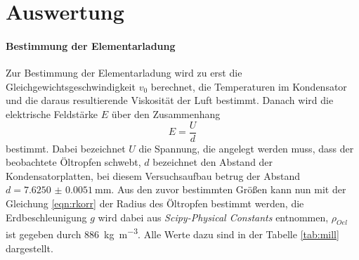 \section{Auswertung}
\label{sec:Auswertung}
\paragraph{Bestimmung der Elementarladung}
Zur Bestimmung der Elementarladung wird zu erst die Gleichgewichtsgeschwindigkeit
$v_0$ berechnet, die Temperaturen im Kondensator und die daraus resultierende
Viskosität der Luft bestimmt. Danach wird die elektrische Feldstärke $E$ über
den Zusammenhang
\begin{equation*}
  E = \frac{U}{d}
\end{equation*}
bestimmt. Dabei bezeichnet $U$ die Spannung, die angelegt werden muss, dass der
beobachtete Öltropfen schwebt, $d$ bezeichnet den Abstand der Kondensatorplatten,
bei diesem Versuchsaufbau betrug der Abstand $d = \SI{7.6250(51)}{\milli\meter}$.
Aus den zuvor bestimmten Größen kann nun mit der Gleichung \eqref{eqn:rkorr}
der Radius des Öltropfen bestimmt werden, die Erdbeschleunigung
$g$ wird dabei aus \textit{Scipy-Physical Constants} \cite{scipy} entnommen, $\rho_{Oel}$ ist gegeben durch
\SI{886}{\kilo\gram\per\cubic\meter}. Alle Werte dazu sind in der Tabelle
\ref{tab:mill} dargestellt.
